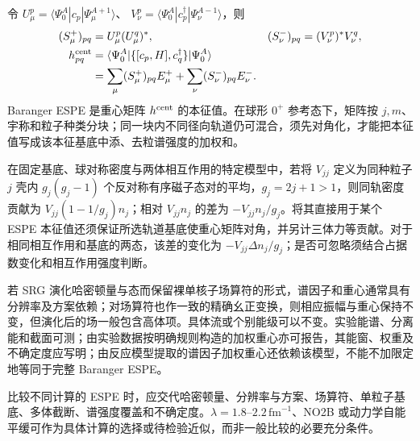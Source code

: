 令 $U_\mu^p=\langle\Psi_0^A|c_p|\Psi_\mu^{A+1}\rangle$、
$V_\nu^p=\langle\Psi_0^A|c_p^\dagger|\Psi_\nu^{A-1}\rangle$，则
\begin{align}
(S_\mu^+)_{pq}&=U_\mu^p(U_\mu^q)^*, &
(S_\nu^-)_{pq}&=(V_\nu^p)^*V_\nu^q,\\
h^{\rm cent}_{pq}&=\langle\Psi_0^A|\{[c_p,H],c_q^\dagger\}|\Psi_0^A\rangle\\
&=\sum_\mu(S_\mu^+)_{pq}E_\mu^+
 +\sum_\nu(S_\nu^-)_{pq}E_\nu^- .
\end{align}
Baranger ESPE 是重心矩阵 $h^{\rm cent}$ 的本征值。在球形 $0^+$ 参考态下，矩阵按 $j,m$、宇称和粒子种类分块；同一块内不同径向轨道仍可混合，须先对角化，才能把本征值写成该本征基底中添、去粒谱强度的加权和。

在固定基底、球对称密度与两体相互作用的特定模型中，若将 $V_{jj}$ 定义为同种粒子 $j$ 壳内 $g_j(g_j-1)$ 个反对称有序磁子态对的平均，$g_j=2j+1>1$，则同轨密度贡献为 $V_{jj}(1-1/g_j)n_j$；相对 $V_{jj}n_j$ 的差为 $-V_{jj}n_j/g_j$。将其直接用于某个 ESPE 本征值还须保证所选轨道基底使重心矩阵对角，并另计三体力等贡献。对于相同相互作用和基底的两态，该差的变化为 $-V_{jj}\Delta n_j/g_j$；是否可忽略须结合占据数变化和相互作用强度判断。

若 SRG 演化哈密顿量与态而保留裸单核子场算符的形式，谱因子和重心通常具有分辨率及方案依赖；对场算符也作一致的精确幺正变换，则相应振幅与重心保持不变，但演化后的场一般包含高体项。具体流或个别能级可以不变。实验能谱、分离能和截面可测；由实验数据按明确规则构造的加权重心亦可报告，其能窗、权重及不确定度应写明；由反应模型提取的谱因子加权重心还依赖该模型，不能不加限定地等同于完整 Baranger ESPE。

比较不同计算的 ESPE 时，应交代哈密顿量、分辨率与方案、场算符、单粒子基底、多体截断、谱强度覆盖和不确定度。$\lambda=1.8$--$2.2\,\mathrm{fm}^{-1}$、NO2B 或动力学自能平缓可作为具体计算的选择或待检验近似，而非一般比较的必要充分条件。

